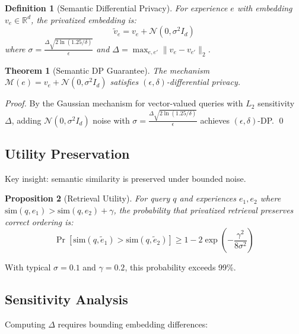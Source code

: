 \documentclass[11pt,letterpaper]{article}
\newtheorem{theorem}{Theorem}[section]
\newtheorem{proposition}[theorem]{Proposition}
\newtheorem{definition}{Definition}[section]
\begin{document}
\begin{definition}[Semantic Differential Privacy]
For experience $e$ with embedding $v_e \in \mathbb{R}^d$, the privatized embedding is:
\begin{equation}
\tilde{v}_e = v_e + \mathcal{N}(0, \sigma^2 I_d)
\end{equation}
where $\sigma = \frac{\Delta \sqrt{2 \ln(1.25/\delta)}}{\epsilon}$ and $\Delta = \max_{e, e'} \|v_e - v_{e'}\|_2$.
\end{definition}

\begin{theorem}[Semantic DP Guarantee]
The mechanism $\mathcal{M}(e) = v_e + \mathcal{N}(0, \sigma^2 I_d)$ satisfies $(\epsilon, \delta)$-differential privacy.
\end{theorem}

\begin{proof}
By the Gaussian mechanism for vector-valued queries with $L_2$ sensitivity $\Delta$, adding $\mathcal{N}(0, \sigma^2 I_d)$ noise with $\sigma = \frac{\Delta \sqrt{2 \ln(1.25/\delta)}}{\epsilon}$ achieves $(\epsilon, \delta)$-DP. \qed
\end{proof}

\subsection{Utility Preservation}

Key insight: semantic similarity is preserved under bounded noise.

\begin{proposition}[Retrieval Utility]
For query $q$ and experiences $e_1, e_2$ where $\text{sim}(q, e_1) > \text{sim}(q, e_2) + \gamma$, the probability that privatized retrieval preserves correct ordering is:
\begin{equation}
\Pr[\text{sim}(q, \tilde{e}_1) > \text{sim}(q, \tilde{e}_2)] \geq 1 - 2\exp\left(-\frac{\gamma^2}{8\sigma^2}\right)
\end{equation}
\end{proposition}

With typical $\sigma = 0.1$ and $\gamma = 0.2$, this probability exceeds 99\%.

\subsection{Sensitivity Analysis}

Computing $\Delta$ requires bounding embedding differences:
\end{document}
